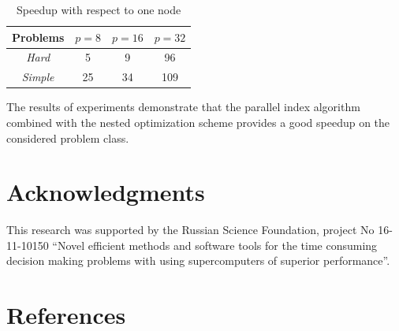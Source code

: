 \documentclass[a4paper]{jpconf}
\begin{document}
\begin{table}
\caption{Speedup with respect to one node}
\label{tab:3}
\begin{center}
\begin{tabular}{cccc}
\hline
Problems & $p = 8$ & $p=16$ & $p=32$ \\
\hline
\textit{Hard} & 5 & 9 & 96\\
\textit{Simple} & 25 & 34& 109\\
\hline
\end{tabular}
\end{center}
\end{table}

The results of experiments demonstrate that the parallel index algorithm combined with the nested optimization scheme provides a good speedup on the considered problem class. 


\section*{Acknowledgments}
This research was supported by the Russian Science Foundation, project No 16-11-10150 ``Novel efficient methods
and software tools for the time consuming decision making problems with using supercomputers of superior performance''.

\bigskip

\section*{References}

\medskip
\end{document}
